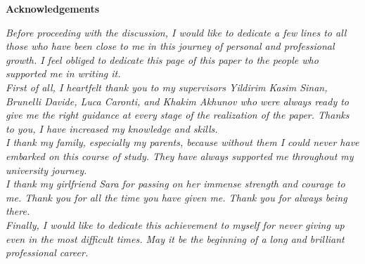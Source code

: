 \thispagestyle{empty}

\begin{center}
  {\bf \Huge Acknowledgements}
\end{center}

\vspace{4cm}

\emph{
  Before proceeding with the discussion, I would like to dedicate a few lines to all those who have been close to me in this journey of personal and professional growth. I feel obliged to dedicate this page of this paper to the people who supported me in writing it. 
 }\\
 \emph{
  First of all, I heartfelt thank you to my supervisors Yildirim Kasim Sinan, Brunelli Davide, Luca Caronti, and Khakim Akhunov who were always ready to give me the right guidance at every stage of the realization of the paper. Thanks to you, I have increased my knowledge and skills.
} \\
  \emph{
  I thank my family, especially my parents, because without them I could never have embarked on this course of study. They have always supported me throughout my university journey.
  }\\
  \emph{
  I thank my girlfriend Sara for passing on her immense strength and courage to me. Thank you for all the time you have given me. Thank you for always being there.
  }\\
  \emph{
  Finally, I would like to dedicate this achievement to myself for never giving up even in the most difficult times. May it be the beginning of a long and brilliant professional career.
}
